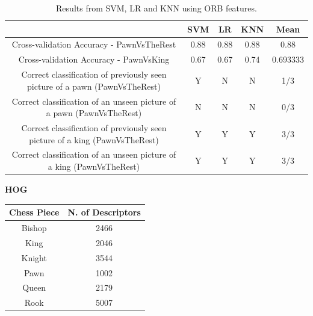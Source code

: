 \documentclass{l4proj}
\begin{document}
\begin{table}[h!] \label{ORBTable2}
	\centering
	\begin{tabular}{|c|c|c|c|c|} 
	\hline
	 & SVM & LR & KNN & Mean  \\
	\hline
	\rowcolor{brown!45} Cross-validation Accuracy - PawnVsTheRest & 0.88 & 0.88 & 0.88 & 0.88 \\
	Cross-validation Accuracy - PawnVsKing & 0.67 & 0.67 & 0.74 & 0.693333\\
	\rowcolor{brown!45} Correct classification of previously seen picture of a pawn (PawnVsTheRest) & Y & N & N & 1/3 \\
	Correct classification of an unseen picture of a pawn (PawnVsTheRest) & N & N & N & 0/3 \\
	\rowcolor{brown!45} Correct classification of previously seen picture of a king (PawnVsTheRest) & Y & Y & Y & 3/3 \\
	Correct classification of an unseen picture of a king (PawnVsTheRest) & Y & Y & Y & 3/3 \\
	\hline
	\end{tabular}
	\caption{Results from SVM, LR and KNN using ORB features.}
\end{table}



\begin{table}[h!] \label{HOGTable1}
	\centering
	\vspace{10mm}
	\textbf{HOG}
	
	\vspace{2mm}
	\begin{tabular}{|c|c|} 
	\hline
	Chess Piece & N. of Descriptors  \\
	\hline
	\rowcolor{brown!45} Bishop & 2466 \\
	King & 2046 \\
	\rowcolor{brown!45} Knight & 3544 \\
	Pawn & 1002 \\
	\rowcolor{brown!45} Queen & 2179 \\
	Rook & 5007 \\
	\hline
	\end{tabular}
\end{table}
\end{document}
